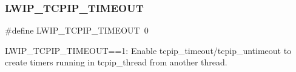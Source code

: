 \subsubsection{\texorpdfstring{L\+W\+I\+P\+\_\+\+T\+C\+P\+I\+P\+\_\+\+T\+I\+M\+E\+O\+UT}{LWIP\_TCPIP\_TIMEOUT}\hspace{0.1cm}{\footnotesize\ttfamily [2/2]}}
{\footnotesize\ttfamily \#define L\+W\+I\+P\+\_\+\+T\+C\+P\+I\+P\+\_\+\+T\+I\+M\+E\+O\+UT~0}

L\+W\+I\+P\+\_\+\+T\+C\+P\+I\+P\+\_\+\+T\+I\+M\+E\+O\+UT==1\+: Enable tcpip\+\_\+timeout/tcpip\+\_\+untimeout to create timers running in tcpip\+\_\+thread from another thread. 